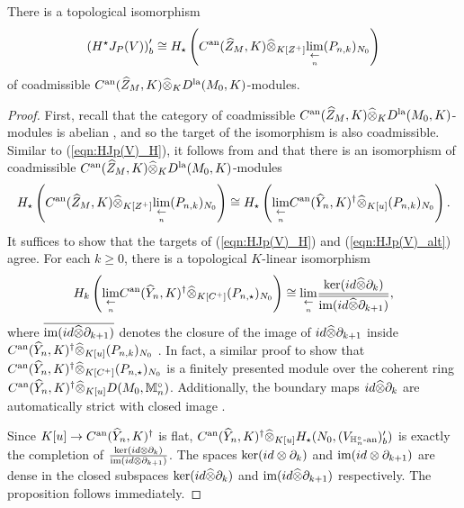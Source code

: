 \documentclass[10pt]{amsart}
\begin{document}
\begin{proposition}\label{prop:limH_H(im)}
There is a topological isomorphism \begin{equation}\label{eqn:limH_H(im)}
    \left(H^{\star}J_{P}(V)\right)^{\prime}_{b} \cong H_{\star} \left(C^{\textnormal{an}}(\widehat{Z}_{M},K)\widehat{\otimes}_{K[Z^{+}]}\underset{\underset{n}{\leftarrow}}{\lim}(P_{n,k})_{N_{0}}\right)
\end{equation} of coadmissible $C^{\textnormal{an}}(\widehat{Z}_{M},K)\widehat{\otimes}_{K}D^{\textnormal{la}}(M_{0},K)$-modules.
\end{proposition}
\begin{proof} First, recall that the category of coadmissible $C^{\textnormal{an}}(\widehat{Z}_{M},K)\widehat{\otimes}_{K}D^{\textnormal{la}}(M_{0},K)$-modules is abelian \cite{ST_dist}, and so the target of the isomorphism is also coadmissible. Similar to (\ref{eqn:HJp(V)_H}), it follows from \cite[Prop. 3.2.28]{Jacquet1} and \cite[Prop. 1.1.32]{analytic} that there is an isomorphism of coadmissible $C^{\textnormal{an}}(\widehat{Z}_{M},K)\widehat{\otimes}_{K}D^{\textnormal{la}}(M_{0},K)$-modules \begin{equation}\label{eqn:HJp(V)_alt}
    H_{\star}\left(C^{\textnormal{an}}(\widehat{Z}_{M},K)\widehat{\otimes}_{K[Z^{+}]}\underset{\underset{n}{\leftarrow}}{\lim}(P_{n,k})_{N_{0}}\right) \cong H_{\star} \left(\underset{\underset{n}{\leftarrow}}{\lim}C^{\textnormal{an}}(\widehat{Y}_{n},K)^{\dagger}\widehat{\otimes}_{K[u]}(P_{n,k})_{N_{0}}\right).
\end{equation} It suffices to show that the targets of (\ref{eqn:HJp(V)_H}) and (\ref{eqn:HJp(V)_alt}) agree. For each $k\geq 0$, there is a topological $K$-linear isomorphism \[
    H_{k} \left(\underset{\underset{n}{\leftarrow}}{\lim}C^{\textnormal{an}}(\widehat{Y}_{n},K)^{\dagger} \widehat{\otimes}_{K[C^{+}]}(P_{n,\star})_{N_{0}}\right) \cong \underset{\underset{n}{\leftarrow}}{\lim} \frac{\ker(id \widehat{\otimes} \partial_{k})}{\overline{\textnormal{im}(id \widehat{\otimes} \partial_{k+1})}},
\] where $\overline{\textnormal{im}(id \widehat{\otimes} \partial_{k+1})}$ denotes the closure of the image of $id \widehat{\otimes} \partial_{k+1}$ inside $C^{\textnormal{an}}(\widehat{Y}_{n},K)^{\dagger} \widehat{\otimes}_{K[u]}(P_{n,k})_{N_{0}}$ \cite[Thm. 3]{Komatsu}. In fact, a similar proof to \cite[Lem. A.11]{Jacquet2} show that $C^{\textnormal{an}}(\widehat{Y}_{n},K)^{\dagger} \widehat{\otimes}_{K[C^{+}]}(P_{n,\star})_{N_{0}}$ is a finitely presented module over the coherent ring $C^{\textnormal{an}}(\widehat{Y}_{n},K)^{\dagger} \widehat{\otimes}_{K[u]}D(M_{0},\mathbb{M}_{n}^{\circ})$. Additionally, the boundary maps $id \widehat{\otimes} \partial_{k}$ are automatically strict with closed image \cite[Prop A.10]{Jacquet2} \cite[Cor 3, p. IV.28]{Bourbaki}. 

Since $K[u]\rightarrow C^{\textnormal{an}}(\widehat{Y}_{n},K)^{\dagger}$ is flat, $C^{\textnormal{an}}(\widehat{Y}_{n},K)^{\dagger}\widehat{\otimes}_{K[u]} H_{\star}(N_{0},(V_{\mathbb{H}_{n}^{\circ}\textnormal{-an}})^{\prime}_{b})$ is exactly the completion of $\frac{\ker(id \otimes \partial_{k})}{\textnormal{im}(id \otimes \partial_{k+1})}$. The spaces $\ker(id\otimes\partial_{k})$ and $\textnormal{im}(id\otimes\partial_{k+1})$ are dense in the closed subspaces $\ker(id\widehat{\otimes}\partial_{k})$ and $\textnormal{im}(id\widehat{\otimes}\partial_{k+1})$ respectively. The proposition follows immediately.
\end{proof}
\end{document}
